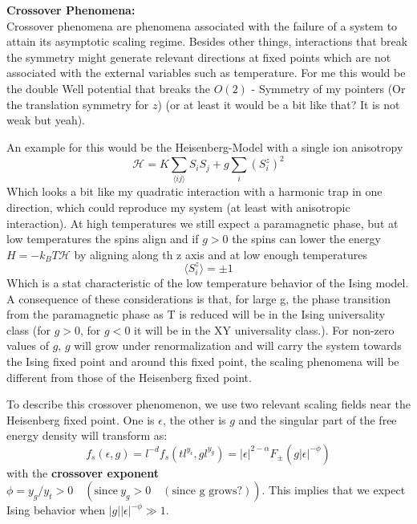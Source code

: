 	\textbf{Crossover Phenomena:} \\
	Crossover phenomena are phenomena associated with the failure of a system to attain its asymptotic scaling regime. Besides other things, interactions that break the symmetry might generate relevant directions at fixed points which are not associated with the external variables such as temperature. For me this would be the double Well potential that breaks the $O(2)$ - Symmetry of my pointers (Or the translation symmetry for $z$) (or at least it would be a bit like that? It is not weak but yeah).
	
	An example for this would be the Heisenberg-Model with a single ion anisotropy
	\begin{equation}
		\mathcal{H} = K \sum_{\langle ij \rangle}^{} S_i S_j + g \sum_{i} (S_i^z)^2
	\end{equation}
	Which looks a bit like my quadratic interaction with a harmonic trap in one direction, which could reproduce my system (at least with anisotropic interaction). At high temperatures we still expect a paramagnetic phase, but at low temperatures the spins align and if $g > 0$ the spins can lower the energy $H =	-k_B T \mathcal{H}$ by aligning along th z axis and at low enough temperatures
	\begin{equation}
		\langle S_i^z \rangle =	\pm 1
	\end{equation}
	Which is a stat characteristic of the low temperature behavior of the Ising model. A consequence of these considerations is that, for large g, the phase transition from the paramagnetic phase as T is reduced will be in the Ising universality class (for $g>0$, for $g < 0$ it will be in the XY universality class.). For non-zero values of $g$, $g$ will grow under renormalization and will carry the system towards the Ising fixed point and around this fixed point, the scaling phenomena will be different from those of the Heisenberg fixed point.
	
	To describe this crossover phenomenon, we use two relevant scaling fields near the Heisenberg fixed point. One is $\epsilon$, the other is $g$ and the singular part of the free energy density will transform as:
	\begin{equation}
		f_s(\epsilon, g) =	l^{-d} f_s(tl^{y_\epsilon}, gl^{y_g}) =	|\epsilon|^{2 - \alpha} F_{\pm}(g|\epsilon|^{-\phi})
	\end{equation}
	with the \textbf{crossover exponent} $\phi = y_g / y_t > 0 \quad (\text{since}~ y_g > 0 \quad (\text{since g grows?}))$. This implies that we expect Ising behavior when $|g| |\epsilon|^{-\phi} \gg 1$.
	
